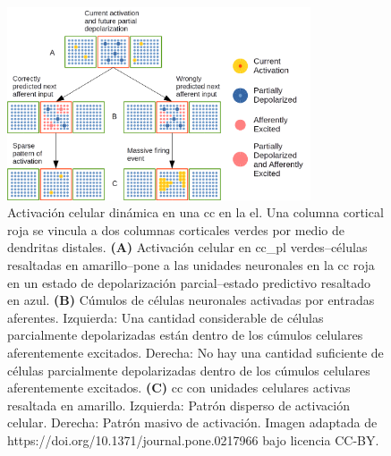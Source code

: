 {\begin{figure}[ht!]
    \centering
    \includegraphics[width=0.8\textwidth]{Activation1.png}
    \caption{Activación celular dinámica en una \gls{cc} en la \gls{el}.
    Una columna cortical roja se vincula a dos columnas corticales verdes por medio de dendritas distales.
    \textbf{(A)} Activación celular en \gls{cc_pl} verdes--células resaltadas en amarillo--pone a las unidades neuronales
    en la \gls{cc} roja en un estado de depolarización parcial--estado predictivo resaltado en azul.
    \textbf{(B)} Cúmulos de células neuronales activadas por entradas aferentes.
    Izquierda: Una cantidad considerable de células parcialmente depolarizadas están dentro de los cúmulos celulares aferentemente excitados.
    Derecha: No hay una cantidad suficiente de células parcialmente depolarizadas dentro de los cúmulos celulares aferentemente excitados.
    \textbf{(C)} \gls{cc} con unidades celulares activas resaltada en amarillo.
    Izquierda: Patrón disperso de activación celular.
    Derecha: Patrón masivo de activación.
    Imagen adaptada de https://doi.org/10.1371/journal.pone.0217966 bajo licencia CC-BY.}
    \label{fig:Activation1}
\end{figure}

}
